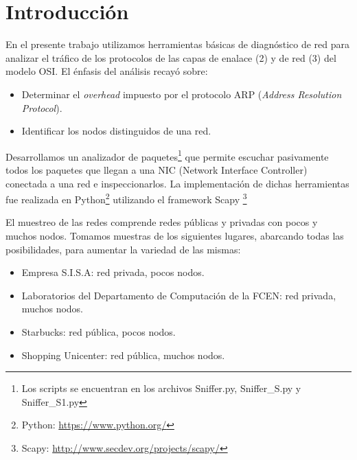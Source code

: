 \section{Introducción}

En el presente trabajo utilizamos herramientas básicas de diagnóstico de red
para analizar el tráfico de los protocolos de las capas de enalace (2) y de red (3) del modelo OSI. El énfasis del análisis recayó sobre:
\begin{itemize}
  \item Determinar el \textit{overhead} impuesto por el protocolo ARP (\textit{Address Resolution Protocol}).
  \item Identificar los nodos distinguidos de una red.
\end{itemize}
Desarrollamos un analizador de paquetes\footnote{Los scripts se encuentran en los archivos Sniffer.py, Sniffer\_S.py y Sniffer\_S1.py} 
que permite escuchar pasivamente todos los paquetes que llegan a una NIC 
(Network Interface Controller) conectada a una red e inspeccionarlos. La implementación de 
dichas herramientas fue realizada en Python\footnote{Python: \url{https://www.python.org/}} utilizando el framework Scapy \footnote{Scapy: \url{http://www.secdev.org/projects/scapy/}}

El muestreo de las redes comprende redes públicas y privadas con pocos y muchos nodos. Tomamos muestras de los siguientes lugares, abarcando todas las posibilidades, para aumentar la variedad de las mismas:
\begin{itemize}
	\item Empresa S.I.S.A: red privada, pocos nodos.
	\item Laboratorios del Departamento de Computación de la FCEN: red privada, muchos nodos.
	\item Starbucks: red pública, pocos nodos.
	\item Shopping Unicenter: red pública, muchos nodos.
\end{itemize}
